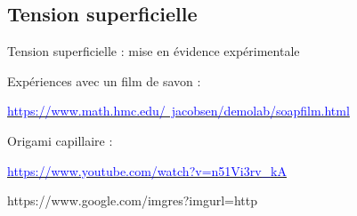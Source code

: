 \subsection{Tension superficielle}

\begin{frame}{Tension superficielle : mise en évidence expérimentale}

Expériences avec un film de savon :



\medskip

\href{https://www.math.hmc.edu/~jacobsen/demolab/soapfilm.html}{
 \textcolor{blue}{
https://www.math.hmc.edu/~jacobsen/demolab/soapfilm.html
}
}

\bigskip


Origami capillaire :

\medskip

\href{https://www.youtube.com/watch?v=n51Vi3rv_kA}{\textcolor{blue}{https://www.youtube.com/watch?v=n51Vi3rv\_kA}}
 

https://www.google.com/imgres?imgurl=http%



\end{frame}





